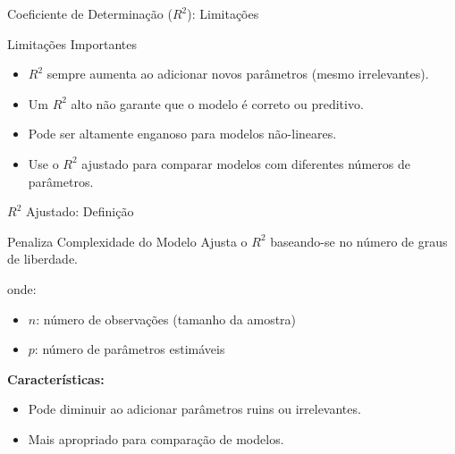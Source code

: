 \begin{frame}{Coeficiente de Determinação ($R^2$): Limitações}
\begin{alertblock}{Limitações Importantes}
\begin{itemize}
    \item $R^2$ sempre aumenta ao adicionar novos parâmetros (mesmo irrelevantes).
    \item Um $R^2$ alto não garante que o modelo é correto ou preditivo.
    \item Pode ser altamente enganoso para modelos não-lineares.
    \item Use o $R^2$ ajustado para comparar modelos com diferentes números de parâmetros.
\end{itemize}
\end{alertblock}
\end{frame}

\begin{frame}{$R^2$ Ajustado: Definição}
\begin{block}{Penaliza Complexidade do Modelo}
Ajusta o $R^2$ baseando-se no número de graus de liberdade.
\end{block}


onde:
\begin{itemize}\small
    \item $n$: número de observações (tamanho da amostra)
    \item $p$: número de parâmetros estimáveis
\end{itemize}

\vspace{0.3cm}

\textbf{Características:}
\begin{itemize}\small
    \item Pode diminuir ao adicionar parâmetros ruins ou irrelevantes.
    \item Mais apropriado para comparação de modelos.
\end{itemize}
\end{frame}

